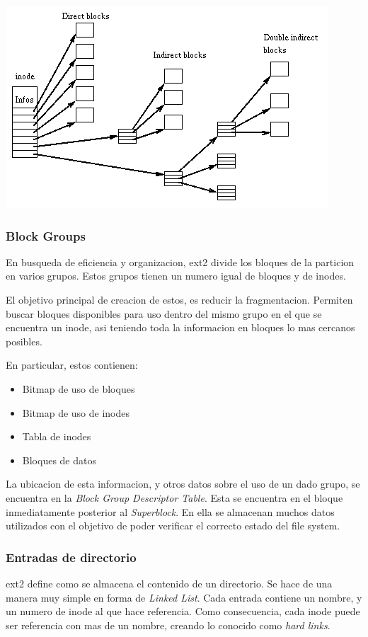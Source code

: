 \documentclass[a4paper,10pt]{article}
\begin{document}
\begin{center}
 \includegraphics{./images/Ext2-inode.png}
\end{center}


\subsubsection{Block Groups}
En busqueda de eficiencia y organizacion, ext2 divide los bloques de la particion en varios grupos.
Estos grupos tienen un numero igual de bloques y de inodes.

El objetivo principal de creacion de estos, es reducir la fragmentacion. 
Permiten buscar bloques disponibles para uso dentro del mismo grupo en el que se encuentra un inode, asi teniendo toda la informacion en bloques lo mas cercanos posibles.

En particular, estos contienen:
\begin{itemize}
\item Bitmap de uso de bloques
\item Bitmap de uso de inodes
\item Tabla de inodes
\item Bloques de datos
\end{itemize}

La ubicacion de esta informacion, y otros datos sobre el uso de un dado grupo, se encuentra en la \textit{Block Group Descriptor Table}.
Esta se encuentra en el bloque inmediatamente posterior al \textit{Superblock}.
En ella se almacenan muchos datos utilizados con el objetivo de poder verificar el correcto estado del file system.

\subsubsection{Entradas de directorio}
ext2 define como se almacena el contenido de un directorio.
Se hace de una manera muy simple en forma de \textit{Linked List}.
Cada entrada contiene un nombre, y un numero de inode al que hace referencia.
Como consecuencia, cada inode puede ser referencia con mas de un nombre, creando lo conocido como \textit{hard links}.
\end{document}
